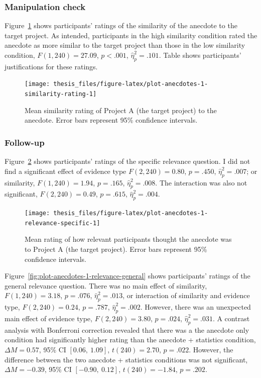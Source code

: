 \documentclass[a4paper, nobind, dvipsnames]{templates/ociamthesis}
\theoremstyle{definition}
\theoremstyle{definition}
\theoremstyle{definition}
\theoremstyle{definition}
\theoremstyle{remark}
\begin{document}
\hypertarget{manipulation-check}{%
\subsubsection{Manipulation check}\label{manipulation-check}}

Figure~\ref{fig:plot-anecdotes-1-similarity-rating} shows participants' ratings
of the similarity of the anecdote to the target project. As intended,
participants in the high similarity condition rated the anecdote as more similar
to the target project than those in the low similarity condition,
\(F(1, 240) = 27.09\), \(p < .001\), \(\hat{\eta}^2_p = .101\). Table shows participants'
justifications for these ratings.



\begin{figure}
\texttt{[image: thesis\_files/figure-latex/plot-anecdotes-1-similarity-rating-1]} \caption{Mean similarity rating of Project A (the target project) to the anecdote. Error bars represent 95\% confidence intervals.}\label{fig:plot-anecdotes-1-similarity-rating}
\end{figure}

\hypertarget{follow-up-5}{%
\subsubsection{Follow-up}\label{follow-up-5}}

Figure~\ref{fig:plot-anecdotes-1-relevance-specific} shows participants' ratings
of the specific relevance question. I did not find a significant effect of
evidence type \(F(2, 240) = 0.80\), \(p = .450\), \(\hat{\eta}^2_p = .007\); or
similarity, \(F(1, 240) = 1.94\), \(p = .165\), \(\hat{\eta}^2_p = .008\). The
interaction was also not significant,
\(F(2, 240) = 0.49\), \(p = .615\), \(\hat{\eta}^2_p = .004\).



\begin{figure}
\texttt{[image: thesis\_files/figure-latex/plot-anecdotes-1-relevance-specific-1]} \caption{Mean rating of how relevant participants thought the anecdote was to Project A (the target project). Error bars represent 95\% confidence intervals.}\label{fig:plot-anecdotes-1-relevance-specific}
\end{figure}

Figure~\ref{fig:plot-anecdotes-1-relevance-general} shows participants' ratings
of the general relevance question. There was no main effect of similarity,
\(F(1, 240) = 3.18\), \(p = .076\), \(\hat{\eta}^2_p = .013\), or interaction of
similarity and evidence type,
\(F(2, 240) = 0.24\), \(p = .787\), \(\hat{\eta}^2_p = .002\). However, there was
an unexpected main effect of evidence type,
\(F(2, 240) = 3.80\), \(p = .024\), \(\hat{\eta}^2_p = .031\). A contrast analysis with
Bonferroni correction revealed that there was a the anecdote only condition had
significantly higher rating than the anecdote + statistics condition,
\(\Delta M = 0.57\), 95\% CI \([0.06,~1.09]\), \(t(240) = 2.70\), \(p = .022\). However, the
difference between the two anecdote + statistics conditions was not significant,
\(\Delta M = -0.39\), 95\% CI \([-0.90,~0.12]\), \(t(240) = -1.84\), \(p = .202\).
\end{document}
